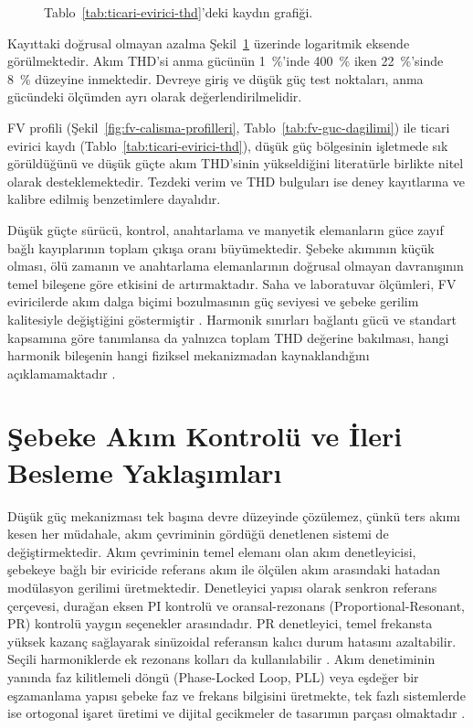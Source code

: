 \begin{figure}[H]
  \centering
  
  \caption{Tablo~\ref{tab:ticari-evirici-thd}'deki kaydın grafiği.}
  \label{fig:ticari-evirici-thd}
\end{figure}

Kayıttaki doğrusal olmayan azalma Şekil~\ref{fig:ticari-evirici-thd} üzerinde logaritmik eksende görülmektedir. Akım THD'si anma gücünün \SI{1}{\percent}'inde \SI{400}{\percent} iken \SI{22}{\percent}'sinde \SI{8}{\percent} düzeyine inmektedir. Devreye giriş ve düşük güç test noktaları, anma gücündeki ölçümden ayrı olarak değerlendirilmelidir.

FV profili (Şekil~\ref{fig:fv-calisma-profilleri}, Tablo~\ref{tab:fv-guc-dagilimi}) ile ticari evirici kaydı (Tablo~\ref{tab:ticari-evirici-thd}), düşük güç bölgesinin işletmede sık görüldüğünü ve düşük güçte akım THD'sinin yükseldiğini literatürle birlikte nitel olarak desteklemektedir. Tezdeki verim ve THD bulguları ise deney kayıtlarına ve kalibre edilmiş benzetimlere dayalıdır.

Düşük güçte sürücü, kontrol, anahtarlama ve manyetik elemanların güce zayıf bağlı kayıplarının toplam çıkışa oranı büyümektedir. Şebeke akımının küçük olması, ölü zamanın ve anahtarlama elemanlarının doğrusal olmayan davranışının temel bileşene göre etkisini de artırmaktadır. Saha ve laboratuvar ölçümleri, FV eviricilerde akım dalga biçimi bozulmasının güç seviyesi ve şebeke gerilim kalitesiyle değiştiğini göstermiştir \citep{Kjaer2005,Chicco2009}. Harmonik sınırları bağlantı gücü ve standart kapsamına göre tanımlansa da yalnızca toplam THD değerine bakılması, hangi harmonik bileşenin hangi fiziksel mekanizmadan kaynaklandığını açıklamamaktadır \citep{IEC61000}.

\section{Şebeke Akım Kontrolü ve İleri Besleme Yaklaşımları}

Düşük güç mekanizması tek başına devre düzeyinde çözülemez, çünkü ters akımı kesen her müdahale, akım çevriminin gördüğü denetlenen sistemi de değiştirmektedir. Akım çevriminin temel elemanı olan akım denetleyicisi, şebekeye bağlı bir eviricide referans akım ile ölçülen akım arasındaki hatadan modülasyon gerilimi üretmektedir. Denetleyici yapısı olarak senkron referans çerçevesi, durağan eksen PI kontrolü ve oransal-rezonans (Proportional-Resonant, PR) kontrolü yaygın seçenekler arasındadır. PR denetleyici, temel frekansta yüksek kazanç sağlayarak sinüzoidal referansın kalıcı durum hatasını azaltabilir. Seçili harmoniklerde ek rezonans kolları da kullanılabilir \citep{Teodorescu2006PR,Teodorescu2011}. Akım denetiminin yanında faz kilitlemeli döngü (Phase-Locked Loop, PLL) veya eşdeğer bir eşzamanlama yapısı şebeke faz ve frekans bilgisini üretmekte, tek fazlı sistemlerde ise ortogonal işaret üretimi ve dijital gecikmeler de tasarımın parçası olmaktadır \citep{Blaabjerg2006,Zhou2018}.

